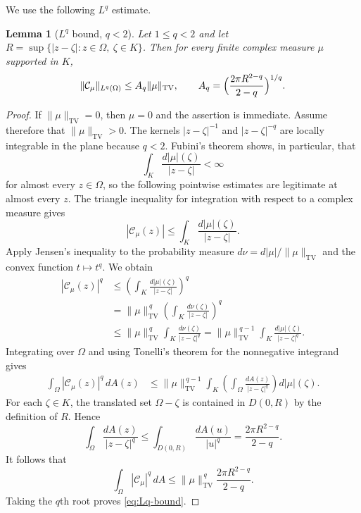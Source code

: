 \documentclass[reqno]{amsart}
\newtheorem{lemma}[theorem]{Lemma}
\theoremstyle{definition}
\theoremstyle{remark}
\newcommand{\Cauchy}{\mathcal C}
\newcommand{\TV}{\mathrm{TV}}
\begin{document}
We use the following $L^q$ estimate.

\begin{lemma}[$L^q$ bound, $q<2$]\label{lem:Lq}
Let $1\leq q<2$ and let $R=\sup\{|z-\zeta|:z\in\Omega,\ \zeta\in K\}$.  Then for
  every finite complex measure $\mu$ supported in $K$,
\begin{equation}\label{eq:Lq-bound}
 \|\Cauchy_\mu\|_{L^q(\Omega)}
 \leq A_q\|\mu\|_{\TV},
 \qquad
 A_q=\Bigl(\frac{2\pi R^{2-q}}{2-q}\Bigr)^{1/q}.
\end{equation}
\end{lemma}

\begin{proof}
If $\|\mu\|_{\TV}=0$, then $\mu=0$ and the assertion is immediate.  Assume
therefore that $\|\mu\|_{\TV}>0$.  The kernels $|z-\zeta|^{-1}$ and $|z-\zeta|^{-q}$ are locally
integrable in the plane because $q<2$.  Fubini's theorem shows, in
particular, that
\[
 \int_K\frac{d|\mu|(\zeta)}{|z-\zeta|}<\infty
\]
for almost every $z\in\Omega$, so the following pointwise estimates are
legitimate at almost every $z$.  The triangle inequality for integration with
respect to a complex measure gives
\[
 |\Cauchy_\mu(z)|
 \leq\int_K\frac{d|\mu|(\zeta)}{|z-\zeta|}.
\]
Apply Jensen's inequality to the probability measure
$d\nu=d|\mu|/\|\mu\|_{\TV}$ and the convex function $t\mapsto t^q$.  We obtain
\begin{align*}
 |\Cauchy_\mu(z)|^q
 &\leq\left(\int_K\frac{d|\mu|(\zeta)}{|z-\zeta|}\right)^q\\
 &=\|\mu\|_{\TV}^{\,q}
   \left(\int_K\frac{d\nu(\zeta)}{|z-\zeta|}\right)^q\\
 &\leq\|\mu\|_{\TV}^{\,q}
   \int_K\frac{d\nu(\zeta)}{|z-\zeta|^q}
 =\|\mu\|_{\TV}^{\,q-1}
   \int_K\frac{d|\mu|(\zeta)}{|z-\zeta|^q}.
\end{align*}
Integrating over $\Omega$ and using Tonelli's theorem for the nonnegative
integrand gives
\begin{align*}
 \int_\Omega|\Cauchy_\mu(z)|^q\,dA(z)
 &\leq\|\mu\|_{\TV}^{\,q-1}\int_K
 \left(\int_\Omega\frac{dA(z)}{|z-\zeta|^{q}}\right)d|\mu|(\zeta).
\end{align*}
For each $\zeta\in K$, the translated set $\Omega-\zeta$ is contained in
$D(0,R)$ by the definition of $R$.  Hence
\[
 \int_\Omega\frac{dA(z)}{|z-\zeta|^{q}}
 \leq\int_{D(0,R)}\frac{dA(u)}{|u|^{q}}
 =\frac{2\pi R^{2-q}}{2-q}.
\]
It follows that
\[
 \int_\Omega|\Cauchy_\mu|^q\,dA
 \leq\|\mu\|_{\TV}^{\,q}\frac{2\pi R^{2-q}}{2-q}.
\]
Taking the $q$th root proves \eqref{eq:Lq-bound}.
\end{proof}
\end{document}
